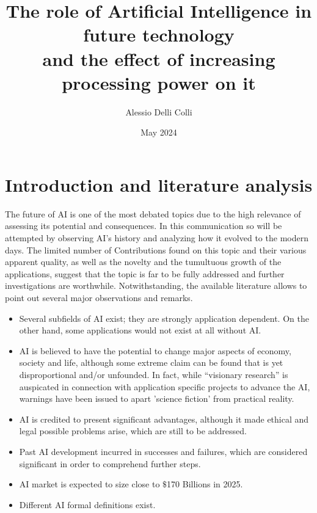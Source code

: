 \documentclass{article}
\title{\LARGE The role of Artificial Intelligence in future technology\\
  
  \large and the effect of increasing processing power on it}
\author{Alessio Delli Colli}
\date{May 2024}
\begin{document}
\maketitle

\newpage



\section{Introduction and literature analysis}
The future of AI is one of the most debated topics due to the high
relevance of assessing its potential and consequences.
In this communication so will be attempted by observing AI's history and
analyzing how it evolved to the modern days.
The limited number of Contributions found on this topic and their various apparent quality, as well
as the novelty and the tumultuous growth of the applications, suggest that the topic is far to be fully
addressed and further investigations are worthwhile.
Notwithstanding, the available literature \cite{futofai1}\cite{futofai2}
\cite{futofai3} allows to point out several major observations and remarks.

\begin{itemize}
\item
  Several subfields of AI exist; they are strongly application dependent. On the other hand, some applications would not exist at all without AI.

\item
  AI is believed to have the potential to change major aspects of economy, society and life, although some extreme claim can be found that is yet
  disproportional and/or unfounded. In fact, while “visionary research” is auspicated in connection with application specific projects to advance
  the AI, warnings have been issued to apart 'science fiction' from practical reality.

\item
  AI is credited to present significant advantages, although it made ethical and legal possible problems arise, which are still to be addressed.

\item
  Past AI development incurred in successes and failures, which are considered significant in order to comprehend further steps.

\item
  AI market is expected to size close to $\$$170 Billions in 2025.

\item
  Different AI formal definitions exist.

\end{itemize}
\end{document}
